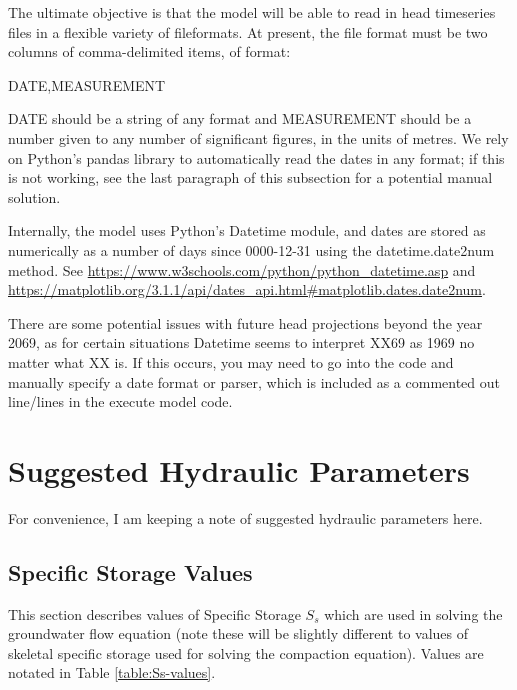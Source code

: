 \documentclass{article}
\begin{document}
The ultimate objective is that the model will be able to read in head timeseries files in a flexible variety of fileformats. At present, the file format must be two columns of comma-delimited items, of format:

DATE,MEASUREMENT

DATE should be a string of any format and MEASUREMENT should be a number given to any number of significant figures, in the units of metres. We rely on Python's pandas library to automatically read the dates in any format; if this is not working, see the last paragraph of this subsection for a potential manual solution.

Internally, the model uses Python's Datetime module, and dates are stored as numerically as a number of days since 0000-12-31 using the datetime.date2num method. See \url{https://www.w3schools.com/python/python_datetime.asp} and \url{https://matplotlib.org/3.1.1/api/dates_api.html\#matplotlib.dates.date2num}.

There are some potential issues with future head projections beyond the year 2069, as for certain situations Datetime seems to interpret XX69 as 1969 no matter what XX is. If this occurs, you may need to go into the code and manually specify a date format or parser, which is included as a commented out line/lines in the execute model code.

\section{Suggested Hydraulic Parameters}

For convenience, I am keeping a note of suggested hydraulic parameters here. 

\subsection{Specific Storage Values}

This section describes values of Specific Storage $S_s$ which are used in solving the groundwater flow equation (note these will be slightly different to values of skeletal specific storage used for solving the compaction equation). Values are notated in Table \ref{table:Ss-values}.
\end{document}
